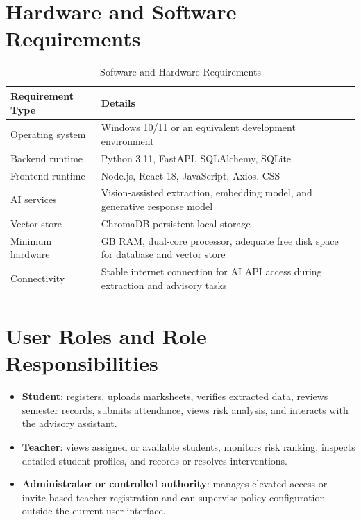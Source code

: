 \section{Hardware and Software Requirements}
\begin{table}[H]
\centering
\caption{Software and Hardware Requirements}
\begin{tabularx}{\textwidth}{>{\raggedright\arraybackslash}p{} >{\raggedright\arraybackslash}X}
\toprule
\textbf{Requirement Type} & \textbf{Details} \\
\midrule
Operating system & Windows 10/11 or an equivalent development environment \\
Backend runtime & Python 3.11, FastAPI, SQLAlchemy, SQLite \\
Frontend runtime & Node.js, React 18, JavaScript, Axios, CSS \\
AI services & Vision-assisted extraction, embedding model, and generative response model \\
Vector store & ChromaDB persistent local storage \\
Minimum hardware & 8 GB RAM, dual-core processor, adequate free disk space for database and vector store \\
Connectivity & Stable internet connection for AI API access during extraction and advisory tasks \\
\bottomrule
\end{tabularx}
\end{table}

\section{User Roles and Role Responsibilities}
\begin{itemize}[leftmargin=*]
\item \textbf{Student}: registers, uploads marksheets, verifies extracted data, reviews semester records, submits attendance, views risk analysis, and interacts with the advisory assistant.
\item \textbf{Teacher}: views assigned or available students, monitors risk ranking, inspects detailed student profiles, and records or resolves interventions.
\item \textbf{Administrator or controlled authority}: manages elevated access or invite-based teacher registration and can supervise policy configuration outside the current user interface.
\end{itemize}

